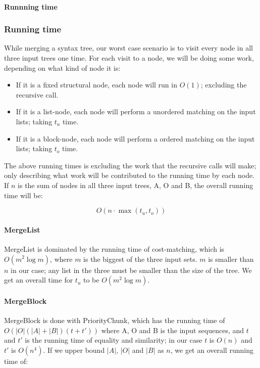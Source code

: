 \documentclass[11pt]{article}
\begin{document}
\paragraph{Runnning time} 


\subsubsection{Running time}
While merging a syntax tree, our worst case scenario is to visit every node in all three input trees one time. For each visit to a node, we will be doing some work, depending on what kind of node it is:

\begin{itemize}
\item If it is a fixed structural node, each node will run in $O(1)$; excluding the recursive call.
\item If it is a list-node, each node will perform a unordered matching on the input lists; taking $t_u$ time.
\item If it is a block-node, each node will perform a ordered matching on the input lists; taking $t_o$ time.
\end{itemize}

The above running times is excluding the work that the recursive calls will make; only describing what work will be contributed to the running time by each node. If $n$ is the sum of nodes in all three input trees, A, O and B, the overall running time will be:

\begin{equation}
O(n \cdot \max(t_u, t_o)) \nonumber
\end{equation}

\paragraph{MergeList} MergeList is dominated by the running time of cost-matching, which is $O(m^2 \log m)$, where $m$ is the biggest of the three input sets. $m$ is smaller than $n$ in our case; any list in the three must be smaller than the size of the tree. We get an overall time for $t_u$ to be $O(m^2 \log m)$.

\paragraph{MergeBlock} MergeBlock is done with PriorityChunk, which has the running time of $O(|O| (|A| + |B|)(t + t'))$ where A, O and B is the input sequences, and $t$ and $t'$ is the running time of equality and similarity; in our case $t$ is $O(n)$ and $t'$ is $O(n^4)$. If we upper bound $|A|$, $|O|$ and $|B|$ as $n$, we get an overall running time of:
\end{document}
